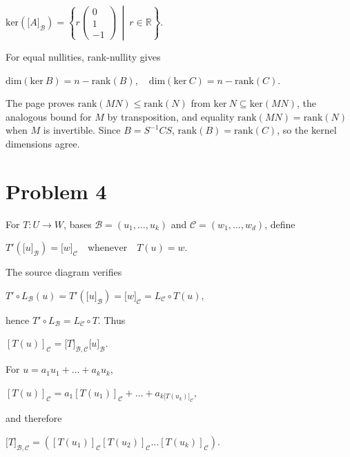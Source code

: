 \(\text{ker}\left( \lbrack A\rbrack_{\mathcal{B}} \right) = \left\{ r\begin{pmatrix}
0 \\
1 \\
{- 1}
\end{pmatrix}\  \middle| \ r \in \mathbb{R} \right\}.\)

For equal nullities, rank-nullity gives

\(\text{dim}\left( {\text{ker}\ B} \right) = n - \text{rank}(B),\quad\text{dim}\left( {\text{ker}\ C} \right) = n - \text{rank}(C).\)

The page proves \(\text{rank}\left( {MN} \right) \leq \text{rank}(N)\) from \(\text{ker}\ N \subseteq \text{ker}\left( {MN} \right)\), the analogous bound for \(M\) by transposition, and equality \(\text{rank}\left( {MN} \right) = \text{rank}(N)\) when \(M\) is invertible. Since \(B = S^{- 1}CS\), \(\text{rank}(B) = \text{rank}(C)\), so the kernel dimensions agree.

\section{Problem 4}

For \(T:U\rightarrow W\), bases \(\mathcal{B} = \left( {u_{1},\ldots,u_{k}} \right)\) and \(\mathcal{C} = \left( {w_{1},\ldots,w_{d}} \right)\), define

\(T'\left( \lbrack u\rbrack_{\mathcal{B}} \right) = \lbrack w\rbrack_{\mathcal{C}}\quad\text{whenever}\quad T(u) = w.\)

The source diagram verifies

\(T' \circ L_{\mathcal{B}}(u) = T'\left( \lbrack u\rbrack_{\mathcal{B}} \right) = \lbrack w\rbrack_{\mathcal{C}} = L_{\mathcal{C}} \circ T(u),\)

hence \(T' \circ L_{\mathcal{B}} = L_{\mathcal{C}} \circ T\). Thus

\(\left\lbrack {T(u)} \right\rbrack_{\mathcal{C}} = \lbrack T\rbrack_{\mathcal{B},\mathcal{C}}\lbrack u\rbrack_{\mathcal{B}}.\)

For \(u = a_{1}u_{1} + \ldots + a_{k}u_{k}\),

\(\left\lbrack {T(u)} \right\rbrack_{\mathcal{C}} = a_{1}\left\lbrack {T\left( u_{1} \right)} \right\rbrack_{\mathcal{C}} + \ldots + a_{{k{\lbrack{T{(u_{k})}}\rbrack}}_{\mathcal{C}}},\)

and therefore

\(\lbrack T\rbrack_{\mathcal{B},\mathcal{C}} = \left( {\left\lbrack {T\left( u_{1} \right)} \right\rbrack_{\mathcal{C}}\left\lbrack {T\left( u_{2} \right)} \right\rbrack_{\mathcal{C}}\ldots\left\lbrack {T\left( u_{k} \right)} \right\rbrack_{\mathcal{C}}} \right).\)

